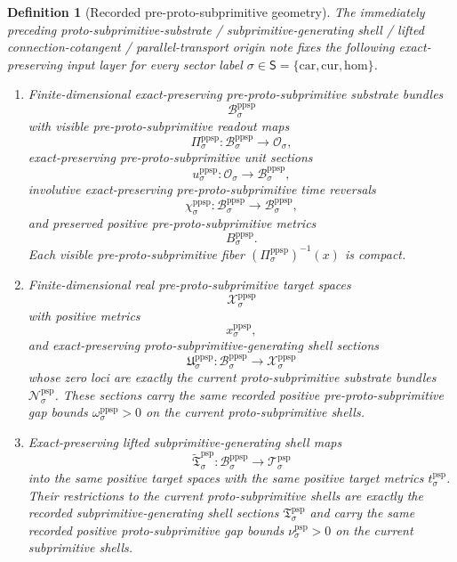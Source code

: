 \documentclass[11pt]{article}
\newcommand{\SectorSet}{\mathsf S}
\newcommand{\Car}{\mathrm{car}}
\newcommand{\Cur}{\mathrm{cur}}
\newcommand{\Hom}{\mathrm{hom}}
\newcommand{\ObjClass}[1]{\mathcal O_{#1}}
\newcommand{\ProtoSubprimTarget}[1]{\mathcal T_{#1}^{\mathrm{psp}}}
\newcommand{\ProtoSubprimTargetMetric}[1]{t_{#1}^{\mathrm{psp}}}
\newcommand{\ProtoSubprimGap}[1]{\nu_{#1}^{\mathrm{psp}}}
\newcommand{\PreProtoSubprimTarget}[1]{\mathcal X_{#1}^{\mathrm{ppsp}}}
\newcommand{\PreProtoSubprimTargetMetric}[1]{x_{#1}^{\mathrm{ppsp}}}
\newcommand{\PreProtoSubprimGap}[1]{\omega_{#1}^{\mathrm{ppsp}}}
\newcommand{\ProtoSubprimSpace}[1]{\mathcal N_{#1}^{\mathrm{psp}}}
\newcommand{\ProtoSubprimSection}[1]{\mathfrak T_{#1}^{\mathrm{psp}}}
\newcommand{\PreProtoSubprimSpace}[1]{\mathcal B_{#1}^{\mathrm{ppsp}}}
\newcommand{\PreProtoSubprimRead}[1]{\Pi_{#1}^{\mathrm{ppsp}}}
\newcommand{\PreProtoSubprimUnit}[1]{u_{#1}^{\mathrm{ppsp}}}
\newcommand{\PreProtoSubprimTimeRev}[1]{\chi_{#1}^{\mathrm{ppsp}}}
\newcommand{\PreProtoSubprimMetric}[1]{B_{#1}^{\mathrm{ppsp}}}
\newcommand{\PreProtoSubprimSection}[1]{\mathfrak U_{#1}^{\mathrm{ppsp}}}
\newcommand{\PreProtoSubprimLiftedSubprimitive}[1]{\widetilde{\mathfrak T}_{#1}^{\mathrm{psp}}}
\newtheorem{definition}{Definition}
\begin{document}
\begin{definition}[Recorded pre-proto-subprimitive geometry]
\label{def:recorded_preproto_geometry}
The immediately preceding proto-subprimitive-substrate / subprimitive-generating shell / lifted connection-cotangent / parallel-transport origin note fixes the following exact-preserving input layer for every sector label \(\sigma\in\SectorSet=\{\Car,\Cur,\Hom\}\).
\begin{enumerate}
    \item Finite-dimensional exact-preserving pre-proto-subprimitive substrate bundles
    \[
    \PreProtoSubprimSpace{\sigma}
    \]
    with visible pre-proto-subprimitive readout maps
    \[
    \PreProtoSubprimRead{\sigma}:\PreProtoSubprimSpace{\sigma}\to\ObjClass{\sigma},
    \]
    exact-preserving pre-proto-subprimitive unit sections
    \[
    \PreProtoSubprimUnit{\sigma}:\ObjClass{\sigma}\to\PreProtoSubprimSpace{\sigma},
    \]
    involutive exact-preserving pre-proto-subprimitive time reversals
    \[
    \PreProtoSubprimTimeRev{\sigma}:\PreProtoSubprimSpace{\sigma}\to\PreProtoSubprimSpace{\sigma},
    \]
    and preserved positive pre-proto-subprimitive metrics
    \[
    \PreProtoSubprimMetric{\sigma}.
    \]
    Each visible pre-proto-subprimitive fiber \((\PreProtoSubprimRead{\sigma})^{-1}(x)\) is compact.
    \item Finite-dimensional real pre-proto-subprimitive target spaces
    \[
    \PreProtoSubprimTarget{\sigma}
    \]
    with positive metrics
    \[
    \PreProtoSubprimTargetMetric{\sigma},
    \]
    and exact-preserving proto-subprimitive-generating shell sections
    \[
    \PreProtoSubprimSection{\sigma}:\PreProtoSubprimSpace{\sigma}\to\PreProtoSubprimTarget{\sigma}
    \]
    whose zero loci are exactly the current proto-subprimitive substrate bundles \(\ProtoSubprimSpace{\sigma}\). These sections carry the same recorded positive pre-proto-subprimitive gap bounds \(\PreProtoSubprimGap{\sigma}>0\) on the current proto-subprimitive shells.
    \item Exact-preserving lifted subprimitive-generating shell maps
    \[
    \PreProtoSubprimLiftedSubprimitive{\sigma}:\PreProtoSubprimSpace{\sigma}\to\ProtoSubprimTarget{\sigma}
    \]
    into the same positive target spaces with the same positive target metrics \(\ProtoSubprimTargetMetric{\sigma}\). Their restrictions to the current proto-subprimitive shells are exactly the recorded subprimitive-generating shell sections \(\ProtoSubprimSection{\sigma}\) and carry the same recorded positive proto-subprimitive gap bounds \(\ProtoSubprimGap{\sigma}>0\) on the current subprimitive shells.

\end{enumerate}
\end{definition}
\end{document}
